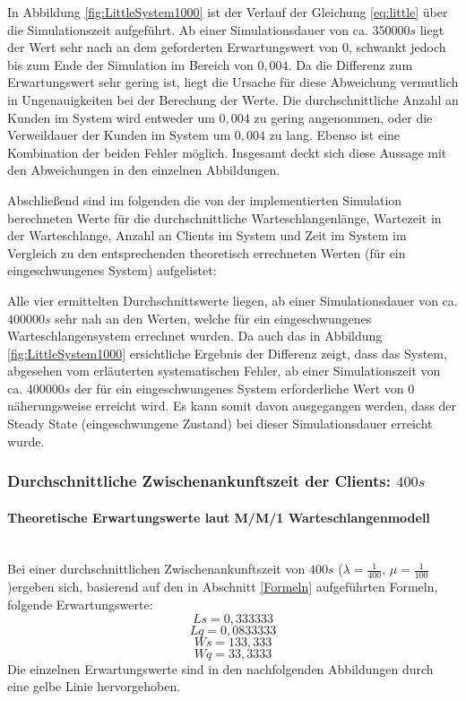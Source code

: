 In Abbildung \ref{fig:LittleSystem1000} ist der Verlauf der Gleichung \ref{eq:little} über die Simulationszeit aufgeführt. Ab einer Simulationsdauer von ca. $350000s$ liegt der Wert sehr nach an dem geforderten Erwartungswert von $0$, schwankt jedoch bis zum Ende der Simulation im Bereich von $0,004$. Da die Differenz zum Erwartungswert sehr gering ist, liegt die Ursache für diese Abweichung vermutlich in Ungenauigkeiten bei der Berechung der Werte. Die durchschnittliche Anzahl an Kunden im System wird entweder um $0,004$ zu gering angenommen, oder die Verweildauer der Kunden im System um $0,004$ zu lang. Ebenso ist eine Kombination der beiden Fehler möglich. Insgesamt deckt sich diese Aussage mit den Abweichungen in den einzelnen Abbildungen.

Abschließend sind im folgenden die von der implementierten Simulation berechneten Werte für die durchschnittliche Warteschlangenlänge, Wartezeit in der Warteschlange, Anzahl an Clients im System und Zeit im System im Vergleich zu den entsprechenden theoretisch errechneten Werten (für ein eingeschwungenes System) aufgelistet:


Alle vier ermittelten Durchschnittswerte liegen, ab einer Simulationsdauer von ca. $400000s$ sehr nah an den Werten, welche für ein eingeschwungenes Warteschlangensystem errechnet wurden. Da auch das in Abbildung  \ref{fig:LittleSystem1000} ersichtliche Ergebnis der Differenz zeigt, dass das System, abgesehen vom erläuterten systematischen Fehler, ab einer Simulationszeit von ca. $400000s$ der für ein eingeschwungenes System erforderliche Wert von $0$ näherungsweise erreicht wird. Es kann somit davon ausgegangen werden, dass der Steady State (eingeschwungene Zustand) bei dieser Simulationsdauer erreicht wurde.

\subsubsection{Durchschnittliche Zwischenankunftszeit der Clients: $400s$}
\paragraph{Theoretische Erwartungswerte laut M/M/1 Warteschlangenmodell}
\\
Bei einer durchschnittlichen Zwischenankunftszeit von $400s$ ($\lambda=\frac{1}{400}$, $\mu=\frac{1}{100}$)ergeben sich, basierend auf den in Abschnitt \ref{Formeln} aufgeführten Formeln, folgende Erwartungswerte:
\begin{equation}
Ls=0,333333
\end{equation}
\begin{equation}
Lq=0,0833333
\end{equation}
\begin{equation}
Ws=133,333
\end{equation}
\begin{equation}
Wq=33,3333
\end{equation}
Die einzelnen Erwartungswerte sind in den nachfolgenden Abbildungen durch eine gelbe Linie hervorgehoben.

